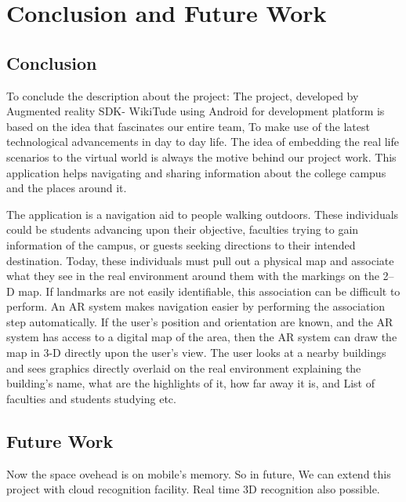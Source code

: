 \documentclass{article}
\begin{document}

\newpage
\section{Conclusion and Future Work}
\subsection{Conclusion}
\par To conclude the description about the project: The project, developed by Augmented reality SDK- WikiTude using Android for development platform is based on the idea that fascinates our entire team, To make use of the latest technological advancements in day to day life. The idea of embedding the real life scenarios to the virtual world is always the motive behind our project work. This application helps navigating and sharing information about the college campus and the places around it. 
\par The application is a navigation aid to people walking outdoors.  These individuals could be students advancing upon their objective, faculties trying to gain information of the campus, or guests seeking directions to their intended destination.  Today, these individuals must pull out a physical map and associate what they see in the real environment around them with the markings on the 2–D map.  If landmarks are not easily identifiable, this association can be difficult to perform.  An AR system makes navigation easier by performing the association step automatically.  If the user's position and orientation are known, and the AR system has access to a digital map of the area, then the AR system can draw the map in 3-D directly upon the user's view.  The user looks at a nearby buildings and sees graphics directly overlaid on the real environment explaining the building’s name, what are the highlights of it, how far away it is, and List of faculties and students studying etc. 

\subsection{Future Work}
\par Now the space ovehead is on mobile's memory. So in future, We can extend this project with cloud recognition facility. Real time 3D recognition also possible.
\end{document}
